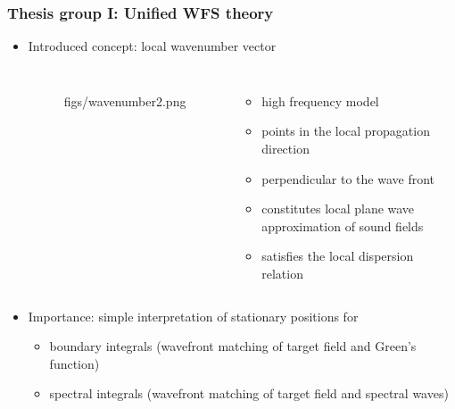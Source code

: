 \documentclass{beamer}
\begin{document}
\begin{frame}
\frametitle{Thesis group I: Unified WFS theory}
\begin{itemize}
\item Introduced concept: 	local wavenumber vector
\begin{columns}
%
\begin{figure}
	\centering
	\begin{overpic}[width = 0.9\columnwidth]{figs/wavenumber2.png}
	\scriptsize
	\end{overpic}
\end{figure}
\footnotesize
%
\begin{itemize}
\item high frequency model
\item points in the local propagation direction
\item perpendicular to the wave front
\item constitutes local plane wave approximation of sound fields
\item satisfies the local dispersion relation
\end{itemize}
\end{columns}
\item Importance: simple interpretation of stationary positions for
\begin{itemize}\footnotesize	
\item boundary integrals (wavefront matching of target field and Green's function)
\item spectral integrals (wavefront matching of target field and spectral waves)
\end{itemize}
\end{itemize}
\end{frame} 
\end{document}
